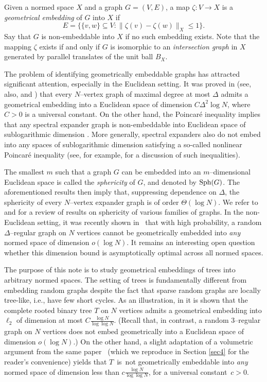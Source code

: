 \documentclass[11pt,leqno]{amsart}
\theoremstyle{remark}
\theoremstyle{plain}
\begin{document}
Given a normed space $X$ and a graph $G=(V,E)$, a map $\zeta\colon V\to X$ is a {\it geometrical embedding} of $G$ into $X$ if
$$ E=\big\{\{v,w\}\subseteq V\colon \|\zeta(v)-\zeta(w)\|_X\leqslant 1\big\}. $$
Say that $G$ is non-embeddable into $X$ if no such embedding exists. Note that the mapping $\zeta$ exists if and only if $G$ is isomorphic
to an {\it intersection graph} in $X$ generated by parallel translates of the unit ball $B_X$.

The problem of identifying geometrically embeddable graphs has attracted significant attention, especially in the Euclidean setting.
It was proved in \cite{FM88} (see, also, \cite{RRS89} and \cite{RRS92}) that every $N$--vertex graph of maximal degree at most $\Delta$ admits a geometrical embedding into a Euclidean space of dimension $C\Delta^2\log N$, where $C>0$ is a universal constant. On the other hand, the Poincar\'e inequality implies that any spectral expander graph is non-embeddable into Euclidean space of sublogarithmic dimension \cite{AT25}. More generally, spectral expanders also do not embed into any spaces of sublogarithmic dimension satisfying a so-called nonlinear Poincar\'e inequality (see, for example, \cite{Na14, MN14, Esk22, ADTT24} for a discussion of such inequalities).

The smallest $m$ such that a graph $G$ can be embedded into an $m$--dimensional Euclidean space is called the {\it sphericity} of $G$, and denoted by ${\rm Sph}(G)$. The aforementioned results then imply that, suppressing dependence on $\Delta$, the sphericity of every $N$--vertex expander graph is of order $\Theta(\log N)$. We refer to \cite[Section~2]{MP93} and \cite[Section~3]{BL05} for a review of results on sphericity of various families of graphs. In the non-Euclidean setting, it was recently shown in~\cite{AT25} that with high probability, a random $\Delta$--regular graph on $N$ vertices cannot be geometrically embedded into {\it any} normed space of dimension $o(\log N)$. It remains an interesting open question whether this dimension bound is asymptotically optimal across all normed spaces.

The purpose of this note is to study geometrical embeddings of trees into arbitrary normed spaces. The setting of trees is fundamentally different from embedding random graphs despite the fact that sparse random graphs are locally tree-like, i.e., have few short cycles.
As an illustration, in \cite{FM86} it is shown that the complete rooted binary tree $T$ on $N$ vertices admits a geometrical embedding into $\ell_2$ of dimension at most $C\frac{\log N}{\log\log N}$. (Recall that, in contrast, a random $3$--regular graph on $N$ vertices
does not embed geometrically into a Euclidean space of dimension $o(\log N)$.) On the other hand, a slight adaptation of a volumetric argument from the same paper~\cite{FM86} (which we reproduce in Section \ref{sec4} for the reader's convenience) yields that $T$~is~not geometrically embeddable into {\it any} normed space of dimension less than $c\frac{\log N}{\log\log N}$, for a universal constant~$c>0$.
\end{document}
